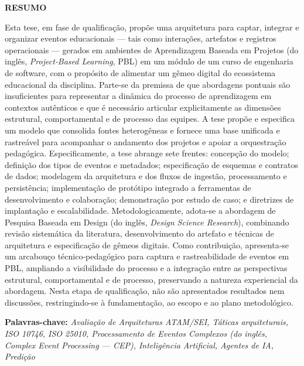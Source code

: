 \documentclass[12pt,a4paper]{article}
\begin{document}
\newpage
\thispagestyle{empty}
\begin{center}
\large
\textbf{RESUMO}
\end{center}
\renewcommand{\baselinestretch}{0.6666666}
Esta tese, em fase de qualificação, propõe uma arquitetura para captar, integrar e organizar eventos educacionais — tais como interações, artefatos e registros operacionais — gerados em ambientes de Aprendizagem Baseada em Projetos (do inglês, \textit{Project‑Based Learning}, PBL) em um módulo de um curso de engenharia de software, com o propósito de alimentar um gêmeo digital do ecossistema educacional da disciplina. Parte-se da premissa de que abordagens pontuais são insuficientes para representar a dinâmica do processo de aprendizagem em contextos autênticos e que é necessário articular explicitamente as dimensões estrutural, comportamental e de processo das equipes. A tese propõe e especifica um modelo que consolida fontes heterogêneas e fornece uma base unificada e rastreável para acompanhar o andamento dos projetos e apoiar a orquestração pedagógica.
Especificamente, a tese abrange sete frentes: concepção do modelo; definição dos tipos de eventos e metadados; especificação de esquemas e contratos de dados; modelagem da arquitetura e dos fluxos de ingestão, processamento e persistência; implementação de protótipo integrado a ferramentas de desenvolvimento e colaboração; demonstração por estudo de caso; e diretrizes de implantação e escalabilidade.
Metodologicamente, adota-se a abordagem de Pesquisa Baseada em Design (do inglês, \textit{Design Science Research}), combinando revisão sistemática da literatura, desenvolvimento do artefato e técnicas de arquitetura e especificação de gêmeos digitais. Como contribuição, apresenta-se um arcabouço técnico‑pedagógico para captura e rastreabilidade de eventos em PBL, ampliando a visibilidade do processo e a integração entre as perspectivas estrutural, comportamental e de processo, preservando a natureza experiencial da abordagem. Nesta etapa de qualificação, não são apresentados resultados nem discussões, restringindo-se à fundamentação, ao escopo e ao plano metodológico.
\vspace{0.5cm}
\begin{flushleft}
{\bf Palavras-chave:} {\it Avaliação de Arquiteturas ATAM/SEI, Táticas arquiteturais, ISO 10746, ISO 25010, Processamento de Eventos Complexos (do inglês, \textit{Complex Event Processing} — CEP), Inteligência Artificial, Agentes de IA, Predição}
\end{flushleft}
\end{document}
